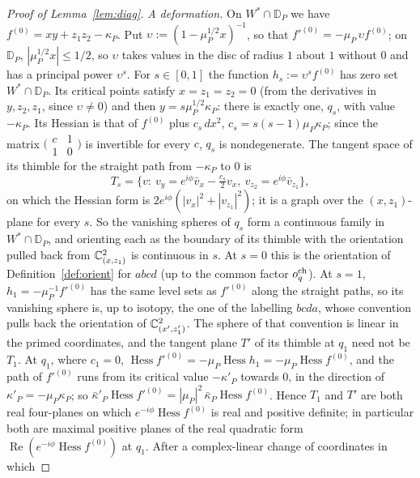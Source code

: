 \begin{proof}[Proof of Lemma~\ref{lem:diag}]
\emph{A deformation.} On $W^*\cap\mathbb D_P$ we have $f^{(0)}=xy+z_1z_2-\kappa_P$. Put $\upsilon:=(1-\mu_P^{1/2}x)^{-1}$, so
that $f'^{(0)}=-\mu_P\,\upsilon f^{(0)}$; on $\mathbb D_P$, $|\mu_P^{1/2}x|\le1/2$, so $\upsilon$ takes values in the disc of
radius $1$ about $1$ without $0$ and has a principal power $\upsilon^s$. For $s\in[0,1]$ the function
$h_s:=\upsilon^sf^{(0)}$ has zero set $W^*\cap\mathbb D_P$. Its critical points satisfy $x=z_1=z_2=0$ (from the derivatives in
$y,z_2,z_1$, since $\upsilon\ne0$) and then $y=s\mu_P^{1/2}\kappa_P$: there is exactly one, $q_s$, with value $-\kappa_P$.
Its Hessian is that of $f^{(0)}$ plus $c_s\,dx^2$, $c_s=s(s-1)\mu_P\kappa_P$; since the matrix $\bigl(\begin{smallmatrix}c&1\\
1&0\end{smallmatrix}\bigr)$ is invertible for every $c$, $q_s$ is nondegenerate. The tangent space of its thimble for the
straight path from $-\kappa_P$ to $0$ is
\[
T_s=\bigl\{v:\ v_y=e^{i\phi}\bar v_x-\tfrac{c_s}2v_x,\ v_{z_2}=e^{i\phi}\bar v_{z_1}\bigr\},
\]
on which the Hessian form is $2e^{i\phi}(|v_x|^2+|v_{z_1}|^2)$; it is a graph over the $(x,z_1)$-plane for every $s$. So the
vanishing spheres of $q_s$ form a continuous family in $W^*\cap\mathbb D_P$, and orienting each as the boundary of its
thimble with the orientation pulled back from $\mathbb C^2_{(x,z_1)}$ is continuous in $s$. At $s=0$ this is the orientation of
Definition~\ref{def:orient} for $abcd$ (up to the common factor $o^{\rm ch}_q$). At $s=1$, $h_1=-\mu_P^{-1}f'^{(0)}$ has the
same level sets as $f'^{(0)}$ along the straight paths, so its vanishing sphere is, up to isotopy, the one of the
labelling $bcda$, whose convention pulls back the orientation of $\mathbb C^2_{(x',z'_1)}$. The sphere of that convention is
linear in the primed coordinates, and the tangent plane $T'$ of its thimble at $q_1$ need not be $T_1$. At $q_1$, where
$c_1=0$, $\operatorname{Hess}f'^{(0)}=-\mu_P\operatorname{Hess}h_1=-\mu_P\operatorname{Hess}f^{(0)}$, and the path of
$f'^{(0)}$ runs from its critical value $-\kappa'_P$ towards $0$, in the direction of $\kappa'_P=-\mu_P\kappa_P$; so
$\bar\kappa'_P\operatorname{Hess}f'^{(0)}=|\mu_P|^2\,\bar\kappa_P\operatorname{Hess}f^{(0)}$.
Hence $T_1$ and $T'$ are both real four-planes on which $e^{-i\phi}\operatorname{Hess}f^{(0)}$ is real and positive
definite; in particular both are maximal positive planes of the real quadratic form
$\operatorname{Re}(e^{-i\phi}\operatorname{Hess}f^{(0)})$ at $q_1$. After a complex-linear change of coordinates in which

\end{proof}

